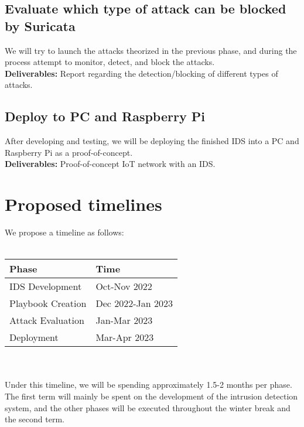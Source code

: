 \documentclass{article}
\begin{document}
\begin{multicols}{2}
\subsection{Evaluate which type of attack can be blocked by Suricata}
We will try to launch the attacks theorized in the previous phase, and during the process attempt to monitor, detect, and block the attacks.\\
\textbf{Deliverables:} Report regarding the detection/blocking of different types of attacks.
\subsection{Deploy to PC and Raspberry Pi}
After developing and testing, we will be deploying the finished IDS into a PC and Raspberry Pi as a proof-of-concept.\\
\textbf{Deliverables:} Proof-of-concept IoT network with an IDS.

\section{Proposed timelines}
We propose a timeline as follows:\\
\\
\noindent
\begin{minipage}{\linewidth}
\centering
\begin{tabular}{l|l}
Phase & Time  \\
\hline
IDS Development & Oct-Nov 2022 \\
Playbook Creation & Dec 2022-Jan 2023 \\
Attack Evaluation & Jan-Mar 2023 \\
Deployment & Mar-Apr 2023
\end{tabular}
\end{minipage}
\\
\\
Under this timeline, we will be spending approximately 1.5-2 months per phase. The first term will mainly be spent on the development of the intrusion detection system, and the other phases will be executed throughout the winter break and the second term.

\end{multicols}



\end{document}

